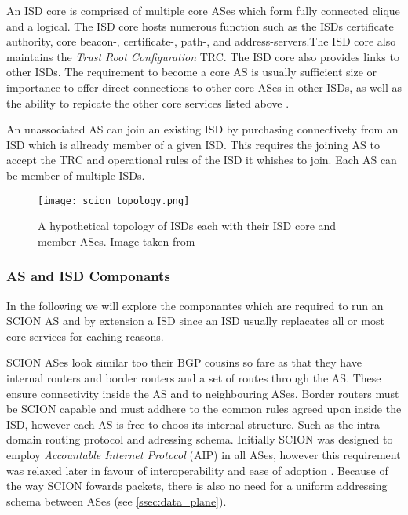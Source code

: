 \documentclass[../eva1_scion.tex]{subfiles}
\begin{document}
    An ISD core is comprised of multiple core ASes which form fully connected clique and a logical. The ISD core hosts numerous function such as the ISDs certificate authority, core beacon-, certificate-, path-, and address-servers.The ISD core also maintains the \textit{Trust Root Configuration} TRC. The ISD core also provides links to other ISDs. The requirement to become a core AS is usually sufficient size or importance to offer direct connections to other core ASes in other ISDs, as well as the ability to repicate the other core services listed above \cite{scion_2011}.

    An unassociated AS can join an existing ISD by purchasing connectivety from an ISD which is allready member of a given ISD. This requires the joining AS to accept the TRC and operational rules of the ISD it whishes to join. Each AS can be member of multiple ISDs.

    \begin{figure}[ht]
        \centering
        \texttt{[image: scion\_topology.png]}
        \caption{A hypothetical topology of ISDs each with their ISD core and member ASes. Image taken from \cite{scion_2017}}%
        \label{fig:isd_topology}
    \end{figure}

    \subsubsection{AS and ISD Componants} \label{sssec:as_componants}

    In the following we will explore the componantes which are required to run an SCION AS and by extension a ISD since an ISD usually replacates all or most core services for caching reasons.

    SCION ASes look similar too their BGP cousins so fare as that they have internal routers and border routers and a set of routes through the AS. These ensure connectivity inside the AS and to neighbouring ASes. Border routers must be SCION capable and must addhere to the common rules agreed upon inside the ISD, however each AS is free to choos its internal structure. Such as the intra domain routing protocol and adressing schema. Initially SCION was designed to employ \textit{Accountable Internet Protocol} (AIP) \cite{scion_2011, aip_2008} in all ASes, however this requirement was relaxed later in favour of interoperability and ease of adoption \cite{scion_2015}. Because of the way SCION fowards packets, there is also no need for a uniform addressing schema between ASes (see \ref{ssec:data_plane}).
\end{document}
